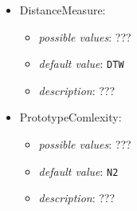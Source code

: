 \documentclass{article}
\begin{document}
\begin{itemize}
    \item DistanceMeasure:
           \begin{itemize}
                \item \emph{possible values}: ???
                \item \emph{default value}: \texttt{DTW}
                \item \emph{description}: ???
           \end{itemize}
    \item PrototypeComlexity:
           \begin{itemize}
                \item \emph{possible values}: ???
                \item \emph{default value}: \texttt{N2}
                \item \emph{description}: ???
           \end{itemize}
\end{itemize}
\end{document}
